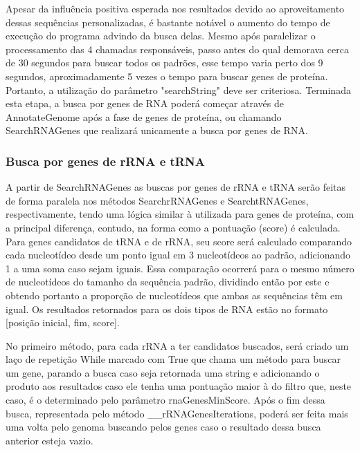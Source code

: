 \documentclass[brazilian,12pt,a4paper,final]{article}
\begin{document}
	\vspace{0.5cm}
	
	Apesar da influência positiva esperada nos resultados devido ao aproveitamento dessas sequências personalizadas, é bastante notável o aumento do tempo de execução do programa advindo da busca delas. Mesmo após paralelizar o processamento das 4 chamadas responsáveis, passo antes do qual demorava cerca de 30 segundos para buscar todos os padrões, esse tempo varia perto dos 9 segundos, aproximadamente 5 vezes o tempo para buscar genes de proteína. Portanto, a utilização do parâmetro "searchString" deve ser criteriosa. Terminada esta etapa, a busca por genes de RNA poderá começar através de AnnotateGenome após a fase de genes de proteína, ou chamando SearchRNAGenes que realizará unicamente a busca por genes de RNA.
	
	\vspace{0.5cm}
	
	\subsubsection{Busca por genes de rRNA e tRNA}
	\vspace{0.5cm}
	
	A partir de SearchRNAGenes as buscas por genes de rRNA e tRNA serão feitas de forma paralela nos métodos SearchrRNAGenes e SearchtRNAGenes, respectivamente,  tendo uma lógica similar à utilizada para genes de proteína, com a principal diferença, contudo, na forma como a pontuação (score) é calculada. Para genes candidatos de tRNA e de rRNA, seu score será calculado comparando cada nucleotídeo desde um ponto igual em 3 nucleotídeos ao padrão, adicionando 1 a uma soma caso sejam iguais. Essa comparação ocorrerá para o mesmo número de nucleotídeos do tamanho da sequência padrão, dividindo então por este e obtendo portanto a proporção de nucleotídeos que ambas as sequências têm em igual. Os resultados retornados para os dois tipos de RNA estão no formato [posição inicial, fim, score].
	
	\vspace{0.5cm}
	
	
	No primeiro método, para cada rRNA a ter candidatos buscados, será criado um laço de repetição While marcado com True que chama um método para buscar um gene, parando a busca caso seja retornada uma string e adicionando o produto aos resultados caso ele tenha uma pontuação maior à do filtro que, neste caso, é o determinado pelo parâmetro rnaGenesMinScore. Após o fim dessa busca, representada pelo método \_\_rRNAGenesIterations, poderá ser feita mais uma volta pelo genoma buscando pelos genes caso o resultado dessa busca anterior esteja vazio.
	
\end{document}
